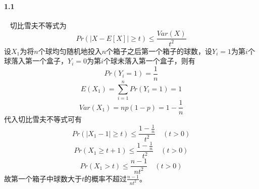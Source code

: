 \paragraph{1.1}~{}
切比雪夫不等式为 $$Pr(|X-E[X]| \ge t) \le \frac{Var(X)}{t^2}$$
设$X_{1}$为将$n$个球均匀随机地投入$n$个箱子之后第一个箱子的球数，设$Y_{i}=1$为第$i$个球落入第一个盒子，$Y_{i}=0$为第$i$个球未落入第一个盒子，则有$$Pr(Y_i=1)= \frac{1}{n}$$
$$E(X_1)= \sum_{i=1}^{n}{Pr(Y_i=1)}=1$$
$$Var(X_1) = np(1-p) = 1-\frac{1}{n}$$
代入切比雪夫不等式可有
$$Pr(|X_1-1| \ge t) \le \frac{1-\frac{1}{n}}{t^2} \quad (t>0)$$
$$Pr(X_1 \ge t+1) \le \frac{1-\frac{1}{n}}{t^2} \quad (t>0)$$
$$Pr(X_1 > t) \le \frac{n-1}{nt^2} \quad (t>0)$$
故第一个箱子中球数大于$t$的概率不超过$\frac{n-1}{nt^2}$。